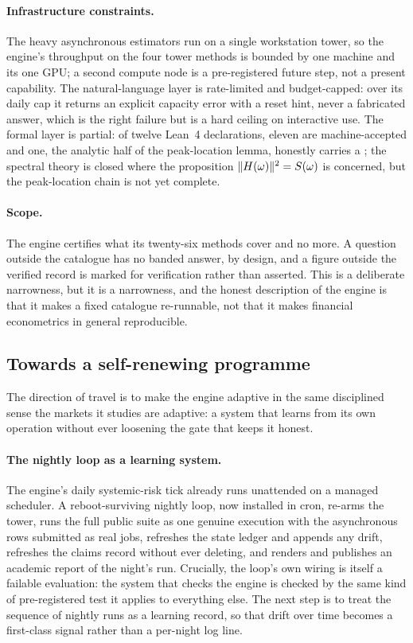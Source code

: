 \paragraph{Infrastructure constraints.} The heavy asynchronous estimators run on
a single workstation tower, so the engine's throughput on the four tower methods
is bounded by one machine and its one GPU; a second compute node is a
pre-registered future step, not a present capability. The natural-language layer
is rate-limited and budget-capped: over its daily cap it returns an explicit
capacity error with a reset hint, never a fabricated answer, which is the right
failure but is a hard ceiling on interactive use. The formal layer is partial:
of twelve Lean~4 declarations, eleven are machine-accepted and one, the analytic
half of the peak-location lemma, honestly carries a ; the spectral
theory is closed where the proposition $\lVert H(\omega) \rVert^2 = S(\omega)$ is
concerned, but the peak-location chain is not yet complete.

\paragraph{Scope.} The engine certifies what its twenty-six methods cover and no
more. A question outside the catalogue has no banded answer, by design, and a
figure outside the verified record is marked for verification rather than
asserted. This is a deliberate narrowness, but it is a narrowness, and the
honest description of the engine is that it makes a fixed catalogue
re-runnable, not that it makes financial econometrics in general reproducible.

\subsection{Towards a self-renewing programme}

The direction of travel is to make the engine adaptive in the same disciplined
sense the markets it studies are adaptive: a system that learns from its own
operation without ever loosening the gate that keeps it honest.

\paragraph{The nightly loop as a learning system.} The engine's daily systemic-risk
tick already runs unattended on a managed scheduler. A reboot-surviving nightly loop,
now installed in cron, re-arms the tower, runs the
full public suite as one genuine execution with the asynchronous rows submitted
as real jobs, refreshes the state ledger and appends any drift, refreshes the
claims record without ever deleting, and renders and publishes an academic report
of the night's run. Crucially, the loop's own wiring is itself a failable
evaluation: the system that checks the engine is checked by the same kind of
pre-registered test it applies to everything else. The next step is to treat the
sequence of nightly runs as a learning record, so that drift over time becomes a
first-class signal rather than a per-night log line.

